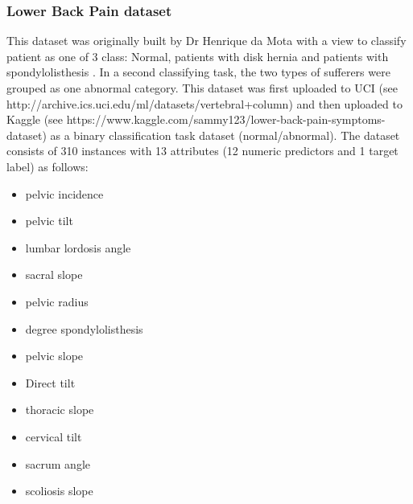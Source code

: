\subsubsection{Lower Back Pain dataset}
This dataset was originally built by Dr Henrique da Mota with a view to classify patient as one of 3 class: Normal, patients with disk hernia and patients with spondylolisthesis \citep{RochaNeto:2009wp}. In a second classifying task, the two types of sufferers were grouped as one abnormal category. This dataset was first uploaded to UCI (see http://archive.ics.uci.edu/ml/datasets/vertebral+column) and then uploaded to Kaggle (see https://www.kaggle.com/sammy123/lower-back-pain-symptoms-dataset) as a binary classification task dataset (normal/abnormal).\newline
The dataset consists of 310 instances with 13 attributes (12 numeric predictors and 1 target label) as follows:
\begin{itemize}
    \item pelvic incidence
    \item pelvic tilt
    \item lumbar lordosis angle
    \item sacral slope
    \item pelvic radius
    \item degree spondylolisthesis
    \item pelvic slope
    \item Direct tilt
    \item thoracic slope
    \item cervical tilt
    \item sacrum angle
    \item scoliosis slope
\end{itemize}

